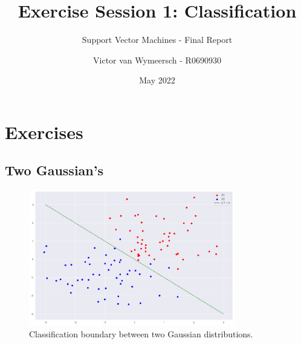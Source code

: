 \documentclass{article}
\title{Exercise Session 1: Classification}
\subtitle{Support Vector Machines - Final Report}
\author{Victor van Wymeersch - R0690930}
\date{May 2022}
\begin{document}
\maketitle

    
    
\section{Exercises}
    \subsection{Two Gaussian's}
        \begin{figure}
            \centering
            \includegraphics[width=0.80\textwidth]{Assignment 1/figures/two_gaussians.png}
            \caption{Classification boundary between two Gaussian distributions. }
            \label{fig:two_gaussians}
        \end{figure}
    
\end{document}
